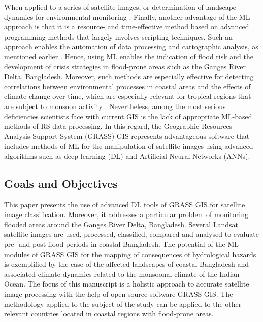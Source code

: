 \documentclass[water,article,accept,pdftex,oneauhor]{Definitions/mdpi}
\begin{document}
When applied to a series of satellite images,  or determination of landscape dynamics for environmental monitoring \cite{9392684,Lemenkova202324}. Finally, another advantage of the ML approach is that it is a resource- and time-effective method based on advanced programming methods that largely involves scripting techniques. Such an approach enables the automation of data processing and cartographic analysis, as mentioned earlier \cite{10282693,Lemenkova202301,10441504}. Hence, using ML enables the indication of flood risk and the development of crisis strategies %
in flood-prone areas such as the Ganges River Delta, Bangladesh. Moreover, such methods are especially effective for detecting correlations between environmental processes {in coastal areas }and {the effects of }climate change over time, which are especially relevant for tropical regions that are subject to monsoon {activity}%
. {Nevertheless, among the most serious deficiencies scientists face with current GIS is the lack of appropriate ML-based methods of RS data processing. In this regard, the Geographic Resources Analysis Support System (GRASS) GIS represents advantageous software that includes methods of ML for the manipulation of satellite images using advanced algorithms such as deep learning (DL) and Artificial Neural Networks (ANNs).}

\subsection{Goals and Objectives}

This paper presents the use of advanced DL tools of GRASS GIS for {satellite }image classification. {Moreover, it addresses a particular problem of monitoring flooded areas around the Ganges River Delta, Bangladesh.} Several Landsat satellite images are used, processed, classified, compared and analysed to evaluate pre- and post-flood periods in coastal Bangladesh. The potential of the ML modules of GRASS GIS for the mapping of consequences of hydrological hazards is exemplified by the case of {the }affected landscapes of coastal Bangladesh and associated climate dynamics related to the monsoonal climate of the Indian Ocean. The focus of this manuscript is a holistic approach to accurate satellite image processing with the help of open-source software GRASS GIS. The methodology applied to the subject of the study can be applied to the other relevant countries located in coastal regions with flood-prone areas.
\end{document}
